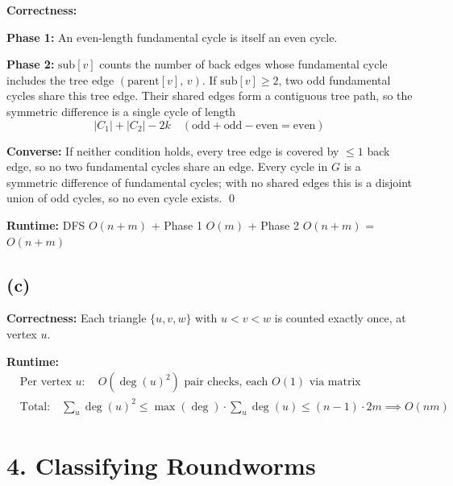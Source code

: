 \documentclass[11pt]{article}
\begin{document}
\textbf{Correctness:}

\textbf{Phase 1:} An even-length fundamental cycle is itself an even cycle.

\textbf{Phase 2:} $\text{sub}[v]$ counts the number of back edges whose fundamental cycle includes the tree edge $(\text{parent}[v],\, v)$. If $\text{sub}[v] \ge 2$, two odd fundamental cycles share this tree edge. Their shared edges form a contiguous tree path, so the symmetric difference is a single cycle of length
\[
|C_1| + |C_2| - 2k \quad (\text{odd} + \text{odd} - \text{even} = \text{even})
\]

\textbf{Converse:} If neither condition holds, every tree edge is covered by $\le 1$ back edge, so no two fundamental cycles share an edge. Every cycle in $G$ is a symmetric difference of fundamental cycles; with no shared edges this is a disjoint union of odd cycles, so no even cycle exists. \qed

\textbf{Runtime:} DFS $O(n + m)$ + Phase 1 $O(m)$ + Phase 2 $O(n + m)$ = $\boxed{O(n + m)}$

\subsection*{(c)}

\begin{algorithm}[H]
\DontPrintSemicolon
{}
\end{algorithm}

\textbf{Correctness:} Each triangle $\{u, v, w\}$ with $u < v < w$ is counted exactly once, at vertex $u$.

\textbf{Runtime:}
\begin{align*}
&\text{Per vertex } u: \quad O(\deg(u)^2) \text{ pair checks, each } O(1) \text{ via matrix} \\
&\text{Total:} \quad \sum_{u} \deg(u)^2 \le \max(\deg) \cdot \sum_{u} \deg(u) \le (n - 1) \cdot 2m \implies \boxed{O(nm)}
\end{align*}


\newpage
\section*{4. Classifying Roundworms}
\end{document}
